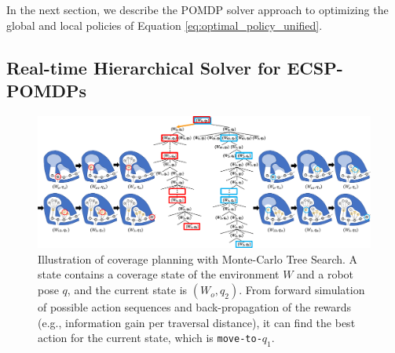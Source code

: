 \documentclass{article}
\begin{document}
In the next section, we describe the POMDP solver approach to optimizing the global and local policies of Equation \ref{eq:optimal_policy_unified}.


\subsection{Real-time Hierarchical Solver for ECSP-POMDPs}



\begin{figure}[t!]
  \centering
  \includegraphics[width=1.0\textwidth]{figures/belief_tree_search_policy.pdf} %
  \caption{Illustration of coverage planning with Monte-Carlo Tree Search. A state contains a coverage state of the environment $W$ and a robot pose $q$, and the current state is $(W_o, q_2)$. From forward simulation of possible action sequences and back-propagation of the rewards (e.g., information gain per traversal distance), it can find the best action for the current state, which is \texttt{move-to-$q_1$}.}
  \label{fig:belief-tree-search}
\end{figure}
\end{document}
